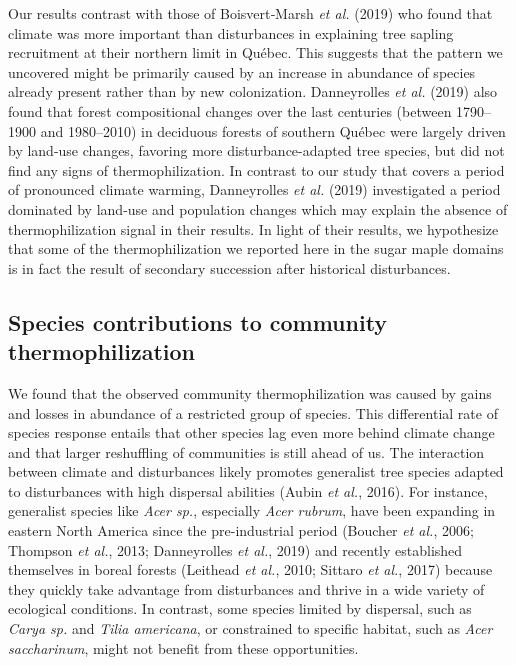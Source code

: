 \documentclass[a4paperpaper,]{article}
\begin{document}
Our results contrast with those of Boisvert‐Marsh \emph{et al.} (2019)
who found that climate was more important than disturbances in
explaining tree sapling recruitment at their northern limit in Québec.
This suggests that the pattern we uncovered might be primarily caused by
an increase in abundance of species already present rather than by new
colonization. Danneyrolles \emph{et al.} (2019) also found that forest
compositional changes over the last centuries (between 1790--1900 and
1980--2010) in deciduous forests of southern Québec were largely driven
by land-use changes, favoring more disturbance-adapted tree species, but
did not find any signs of thermophilization. In contrast to our study
that covers a period of pronounced climate warming, Danneyrolles
\emph{et al.} (2019) investigated a period dominated by land-use and
population changes which may explain the absence of thermophilization
signal in their results. In light of their results, we hypothesize that
some of the thermophilization we reported here in the sugar maple
domains is in fact the result of secondary succession after historical
disturbances.

\hypertarget{species-contributions-to-community-thermophilization}{%
\subsection{Species contributions to community
thermophilization}\label{species-contributions-to-community-thermophilization}}

We found that the observed community thermophilization was caused by
gains and losses in abundance of a restricted group of species. This
differential rate of species response entails that other species lag
even more behind climate change and that larger reshuffling of
communities is still ahead of us. The interaction between climate and
disturbances likely promotes generalist tree species adapted to
disturbances with high dispersal abilities (Aubin \emph{et al.}, 2016).
For instance, generalist species like \emph{Acer sp.}, especially
\emph{Acer rubrum}, have been expanding in eastern North America since
the pre-industrial period (Boucher \emph{et al.}, 2006; Thompson
\emph{et al.}, 2013; Danneyrolles \emph{et al.}, 2019) and recently
established themselves in boreal forests (Leithead \emph{et al.}, 2010;
Sittaro \emph{et al.}, 2017) because they quickly take advantage from
disturbances and thrive in a wide variety of ecological conditions. In
contrast, some species limited by dispersal, such as \emph{Carya sp.}
and \emph{Tilia americana}, or constrained to specific habitat, such as
\emph{Acer saccharinum}, might not benefit from these opportunities.
\end{document}
